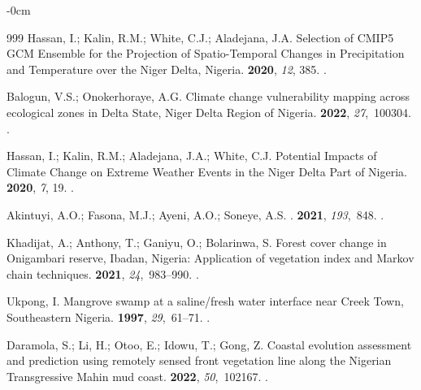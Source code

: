 \documentclass[jmse,article,accept,pdftex,moreauthors]{Definitions/mdpi}
\begin{document}
\begin{adjustwidth}{-\extralength}{0cm}
\begin{thebibliography}{999}
Hassan, I.; Kalin, R.M.; White, C.J.; Aladejana, J.A.
\newblock Selection of CMIP5 GCM Ensemble for the Projection of Spatio-Temporal
  Changes in Precipitation and Temperature over the Niger Delta, Nigeria.
 {\bf 2020}, {\em 12}, 385.
.

Balogun, V.S.; Onokerhoraye, A.G.
\newblock Climate change vulnerability mapping across ecological zones in Delta
  State, Niger Delta Region of Nigeria.
 {\bf 2022}, {\em 27},~100304.
.

Hassan, I.; Kalin, R.M.; Aladejana, J.A.; White, C.J.
\newblock Potential Impacts of Climate Change on Extreme Weather Events in the
  Niger Delta Part of Nigeria.
 {\bf 2020}, {\em 7}, 19.
.

Akintuyi, A.O.; Fasona, M.J.; Ayeni, A.O.; Soneye, A.S.
.
 {\bf 2021}, {\em 193},~848.
.

Khadijat, A.; Anthony, T.; Ganiyu, O.; Bolarinwa, S.
\newblock Forest cover change in Onigambari reserve, Ibadan, Nigeria:
  Application of vegetation index and Markov chain techniques.
 {\bf 2021}, {\em
  24},~983--990.
.

Ukpong, I.
\newblock Mangrove swamp at a saline/fresh water interface near Creek Town,
  Southeastern Nigeria.
 {\bf 1997}, {\em 29},~61--71.
.

Daramola, S.; Li, H.; Otoo, E.; Idowu, T.; Gong, Z.
\newblock Coastal evolution assessment and prediction using remotely sensed
  front vegetation line along the Nigerian Transgressive Mahin mud coast.
 {\bf 2022}, {\em 50},~102167.
.


\end{thebibliography}
\end{adjustwidth}
\end{document}

